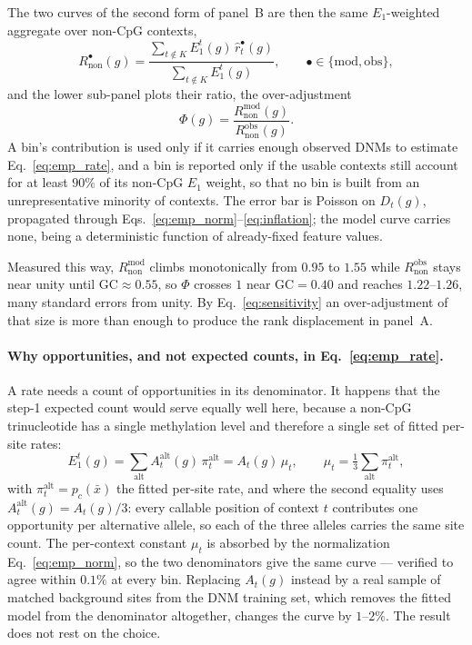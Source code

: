 \documentclass{article}
\begin{document}
The two curves of the second form of panel~B are then the same $E_1$-weighted
aggregate over non-CpG contexts,
\begin{equation}
    R^{\bullet}_{\mathrm{non}}(g)
      = \frac{\sum_{t \notin K} E_1^{t}(g)\, \hat{r}^{\bullet}_t(g)}
             {\sum_{t \notin K} E_1^{t}(g)},
    \qquad \bullet \in \{\mathrm{mod}, \mathrm{obs}\},
\end{equation}
and the lower sub-panel plots their ratio, the over-adjustment
\begin{equation}
    \Phi(g) = \frac{R^{\mathrm{mod}}_{\mathrm{non}}(g)}{R^{\mathrm{obs}}_{\mathrm{non}}(g)}.
    \label{eq:inflation}
\end{equation}
A bin's contribution is used only if it carries enough observed DNMs to estimate
Eq.~\eqref{eq:emp_rate}, and a bin is reported only if the usable contexts still
account for at least $90\%$ of its non-CpG $E_1$ weight, so that no bin is built
from an unrepresentative minority of contexts. The error bar is Poisson on
$D_t(g)$, propagated through Eqs.~\eqref{eq:emp_norm}--\eqref{eq:inflation}; the
model curve carries none, being a deterministic function of already-fixed feature
values.

Measured this way, $R^{\mathrm{mod}}_{\mathrm{non}}$ climbs monotonically from $0.95$
to $1.55$ while $R^{\mathrm{obs}}_{\mathrm{non}}$ stays near unity until
$\mathrm{GC}\approx0.55$, so $\Phi$ crosses $1$ near $\mathrm{GC}=0.40$ and
reaches $1.22$--$1.26$, many standard errors from unity. By
Eq.~\eqref{eq:sensitivity} an over-adjustment of that size is more than enough to
produce the rank displacement in panel~A.

\paragraph{Why opportunities, and not expected counts, in Eq.~\eqref{eq:emp_rate}.}
A rate needs a count of opportunities in its denominator. It happens that the
step-1 expected count would serve equally well here, because a non-CpG
trinucleotide has a single methylation level and therefore a single set of fitted
per-site rates:
\begin{equation}
    E_1^{t}(g) = \sum_{\mathrm{alt}} A_t^{\mathrm{alt}}(g)\, \pi_t^{\mathrm{alt}}
               = A_t(g)\, \mu_t ,
    \qquad
    \mu_t = \tfrac{1}{3}\textstyle\sum_{\mathrm{alt}} \pi_t^{\mathrm{alt}},
\end{equation}
with $\pi_t^{\mathrm{alt}} = p_c(\bar{x})$ the fitted per-site rate, and where the
second equality uses $A_t^{\mathrm{alt}}(g) = A_t(g)/3$: every callable position
of context $t$ contributes one opportunity per alternative allele, so each of the
three alleles carries the same site count. The
per-context constant $\mu_t$ is absorbed by the normalization
Eq.~\eqref{eq:emp_norm}, so the two denominators give the same curve --- verified
to agree within $0.1\%$ at every bin. Replacing $A_t(g)$ instead by a real sample
of matched background sites from the DNM training set, which removes the fitted
model from the denominator altogether, changes the curve by $1$--$2\%$. The result
does not rest on the choice.
\end{document}
